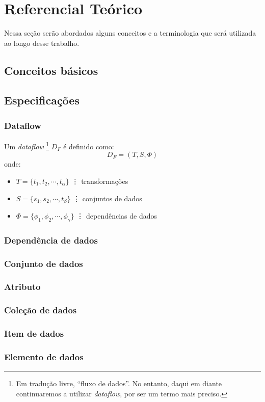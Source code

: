 
\chapter{Referencial Teórico}%
\label{chap:referencial-teorico}


Nessa seção serão abordados alguns conceitos e a terminologia que será utilizada ao longo desse trabalho.

\section{Conceitos básicos}

\section{Especificações}

\subsection{Dataflow}

Um \textit{dataflow}%
\footnote{Em tradução livre, ``fluxo de dados''. No entanto, daqui em diante continuaremos a utilizar \textit{dataflow}, por ser um termo mais preciso.}
$D_F$ é definido como:
%
$$ D_F = (T, S, \Phi) $$
%
onde:
%
\begin{itemize}
    \item $T = \{t_1, t_2, \cdots, t_{\alpha}\}$ \vdots{} transformações
    \item $S = \{s_1, s_2, \cdots, t_{\beta}\}$ \vdots{} conjuntos de dados
    \item $\Phi = \{\phi_1, \phi_2, \cdots, \phi_{\gamma}\}$ \vdots{} dependências de dados
\end{itemize}

\subsection{Dependência de dados}

\subsection{Conjunto de dados}

\subsection{Atributo}

\subsection{Coleção de dados}

\subsection{Item de dados}

\subsection{Elemento de dados}
